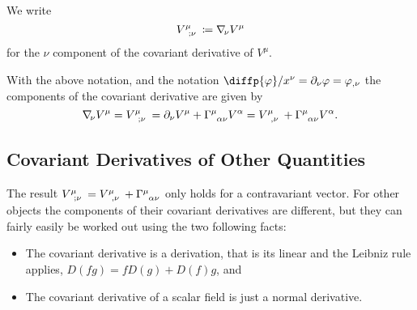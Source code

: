 \documentclass[fleqn]{NotesClass}
\newcommand*{\christoffel}[3]{\tensor{\Gamma}{^{#1}_{{#2}{#3}}}}
\newcommand*{\covariantDerivative}[1]{\nabla_{\!#1}}
\begin{document}
    \begin{ntn}{}{}
        We write
        \begin{equation}
            \tensor{V}{^\mu_{;\nu}} \coloneqq \covariantDerivative{\nu} V^\mu
        \end{equation}
        for the \(\nu\) component of the covariant derivative of \(V^\mu\).
    \end{ntn}
    
    With the above notation, and the notation \(\diffp{\varphi}/{x^\nu} = \partial_\nu \varphi = \varphi_{,\nu}\) the components of the covariant derivative are given by
    \begin{equation}
        \covariantDerivative{\nu} V^\mu = \tensor{V}{^\mu_{;\nu}} = \partial_\nu V^\mu + \christoffel{\mu}{\alpha}{\nu} V^\alpha = \tensor{V}{^\mu_{,\nu}} + \christoffel{\mu}{\alpha}{\nu} V^\alpha.
    \end{equation}
    
    \subsection{Covariant Derivatives of Other Quantities}
    The result \(\tensor{V}{^\mu_{;\nu}} = \tensor{V}{^\mu_{,\nu}} + \christoffel{\mu}{\alpha}{\nu}\) only holds for a contravariant vector.
    For other objects the components of their covariant derivatives are different, but they can fairly easily be worked out using the two following facts:
    \begin{itemize}
        \item The covariant derivative is a derivation, that is its linear and the Leibniz rule applies, \(D(fg) = fD(g) + D(f)g\), and
        \item The covariant derivative of a scalar field is just a normal derivative.
    \end{itemize}
    
\end{document}
